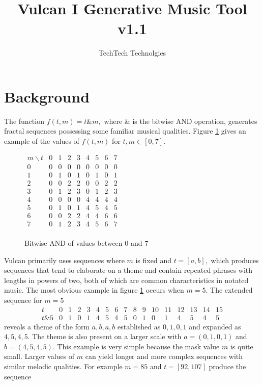 \documentclass{article}
\begin{document}
\title{Vulcan I Generative Music Tool v1.1}
\date{}
\author{TechTech Technolgies}
\maketitle

\tableofcontents

\section{Background}

The function $f(t,m) = t \& m,$ where $\&$ is the bitwise AND operation, generates fractal sequences possessing some familiar musical qualities. Figure \ref{fig:maskTable} gives an example of the values of $f(t,m)$ for $t,m \in [0,7].$ 

\begin{figure}[h]
\center
$
\begin{array}{c|llllllll}
m\backslash t & 0 & 1 & 2 & 3 & 4 & 5 & 6 & 7\\\hline
0& 0 & 0 & 0 & 0 & 0 & 0 & 0 & 0\\
1& 0 & 1 & 0 & 1 & 0 & 1 & 0 & 1\\
2& 0 & 0 & 2 & 2 & 0 & 0 & 2 & 2\\
3& 0 & 1 & 2 & 3 & 0 & 1 & 2 & 3\\
4& 0 & 0 & 0 & 0 & 4 & 4 & 4 & 4\\
5& 0 & 1 & 0 & 1 & 4 & 5 & 4 & 5\\
6& 0 & 0 & 2 & 2 & 4 & 4 & 6 & 6\\
7& 0 & 1 & 2 & 3 & 4 & 5 & 6 & 7\\
\end{array}
$
\caption{Bitwise AND of values between 0 and 7}
\label{fig:maskTable}
\end{figure}
Vulcan primarily uses sequences where $m$ is fixed and $t = [a,b],$ which produces sequences that tend to elaborate on a theme and contain repeated phrases with lengths in powers of two, both of which are common characteristics in notated music. The most obvious example in figure \ref{fig:maskTable} occurs when $m=5$. The extended sequence for $m=5$
$$
\begin{array}{l|llllllllllllllll}
t    & 0 & 1 & 2 & 3 & 4 & 5 & 6 & 7 & 8 & 9 & 10 & 11 & 12 & 13 & 14 & 15\\ \hline
t\&5 & 0 & 1 & 0 & 1 & 4 & 5 & 4 & 5 & 0 & 1 & 0 & 1 & 4 & 5 & 4 & 5
\end{array}
$$
reveals a theme of the form $a, b, a, b$ established as $0,1,0,1$ and expanded as $4,5,4,5$. The theme is also present on a larger scale with $a = (0,1,0,1)$ and $b = (4,5,4,5)$. This example is very simple because the mask value $m$ is quite small. Larger values of $m$ can yield longer and more complex sequences with similar melodic qualities. For example $m=85$ and $t = [92,107]$ produce the sequence
\end{document}
